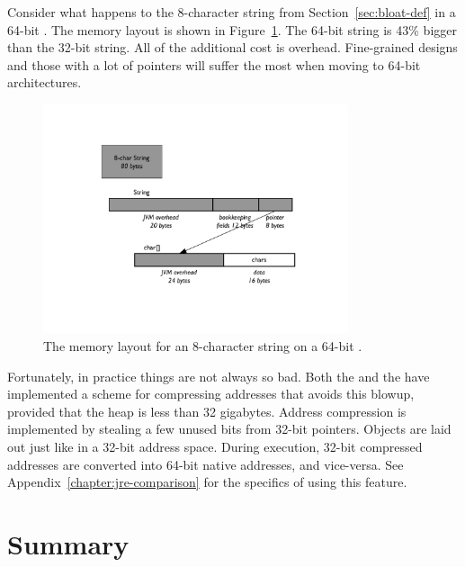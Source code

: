 Consider what happens to the 8-character string from
Section~\ref{sec:bloat-def} in a 64-bit \jre. The memory layout is shown in
Figure~\ref{fig:8-char-string-64-bit}. The 64-bit string is 43\% bigger than the
32-bit string. All of the additional cost is overhead. Fine-grained designs
and those with a lot of pointers will suffer the most when moving to 64-bit
architectures.
 
 \begin{figure}
  \centering

 \includegraphics[width=0.8\textwidth]{part1/Figures/modelingdatatypes/8-char-string-64-bit.pdf}
  \caption{The memory layout for an 8-character string on a 64-bit \jre.}
  \label{fig:8-char-string-64-bit}
\end{figure}

Fortunately, in practice things are not always so bad. Both the \oracle and the
\ibm \jres have implemented a scheme for compressing addresses that avoids this blowup, provided that the heap is
less than 32 gigabytes. Address compression is implemented by stealing a few unused bits from 32-bit pointers.
Objects are laid out just like in a 32-bit
address space. During execution, 32-bit compressed addresses are converted into
64-bit native addresses, and vice-versa.  See Appendix~\ref{chapter:jre-comparison} for the
specifics of using this feature.


\section{Summary}

